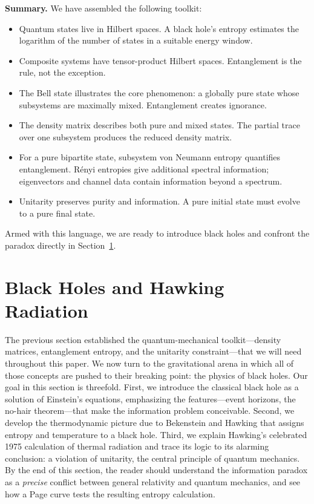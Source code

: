 \documentclass[11pt,letterpaper]{article}
\theoremstyle{plain}
\theoremstyle{definition}
\theoremstyle{remark}
\begin{document}
\bigskip
\noindent\textbf{Summary.}
We have assembled the following toolkit:
\begin{itemize}[itemsep=1pt]
\item Quantum states live in Hilbert spaces.  A black hole's entropy estimates the logarithm of the number of states in
a suitable energy window.
\item Composite systems have tensor-product Hilbert spaces.  Entanglement is the rule,
not the exception.
\item The Bell state illustrates the core phenomenon: a globally pure state whose
subsystems are maximally mixed.  Entanglement creates ignorance.
\item The density matrix describes both pure and mixed states.  The partial trace over
one subsystem produces the reduced density matrix.
\item For a pure bipartite state, subsystem von Neumann entropy quantifies
entanglement. R\'{e}nyi entropies give additional spectral information;
eigenvectors and channel data contain information beyond a spectrum.
\item Unitarity preserves purity and information.  A pure initial state must evolve to a
pure final state.
\end{itemize}
Armed with this language, we are ready to introduce black holes and confront the
paradox directly in Section~\ref{sec03:black_holes}.


\section{Black Holes and Hawking Radiation}\label{sec03:black_holes}

The previous section established the quantum-mechanical toolkit---density
matrices, entanglement entropy, and the unitarity constraint---that we will need
throughout this paper.  We now turn to the gravitational arena in which all of those
concepts are pushed to their breaking point: the physics of black holes.  Our
goal in this section is threefold.  First, we introduce the classical black hole
as a solution of Einstein's equations, emphasizing the features---event
horizons, the no-hair theorem---that make the information problem conceivable.
Second, we develop the thermodynamic picture due to Bekenstein and Hawking that
assigns entropy and temperature to a black hole.  Third, we explain Hawking's
celebrated 1975 calculation of thermal radiation and trace its logic to its
alarming conclusion: a violation of unitarity, the central principle of quantum
mechanics.  By the end of this section, the reader should understand the
information paradox as a \emph{precise} conflict between general relativity and
quantum mechanics, and see how a Page curve tests the resulting entropy calculation.
\end{document}
